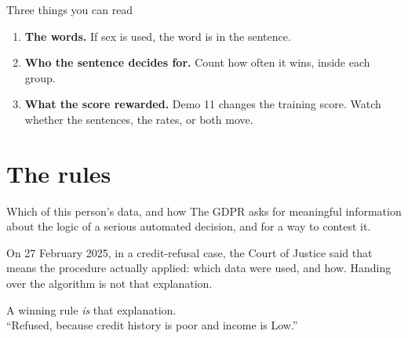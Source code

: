 \documentclass[aspectratio=169,11pt]{beamer}
\begin{document}
\begin{frame}{Three things you can read}
  \begin{enumerate}
    \item \textbf{The words.} If sex is used, the word is in the sentence.
    \item \textbf{Who the sentence decides for.} Count how often it wins, inside each group.
    \item \textbf{What the score rewarded.} Demo 11 changes the training score. Watch whether the sentences, the rates, or both move.
  \end{enumerate}
\end{frame}

\section{The rules}

\begin{frame}{Which of this person's data, and how}
  The GDPR asks for meaningful information about the logic of a serious automated decision, and for a way to contest it.
  \vspace{0.55em}

  On 27 February 2025, in a credit-refusal case, the Court of Justice said that means the procedure actually applied: which data were used, and how. Handing over the algorithm is not that explanation.

  \vspace{0.55em}
  \colorbox{ebdsage}{\parbox{0.96\textwidth}{%
    \vspace{0.35em}
    A winning rule \emph{is} that explanation.\\
    ``Refused, because credit history is poor and income is Low.''
    \vspace{0.35em}}}
\end{frame}
\end{document}
